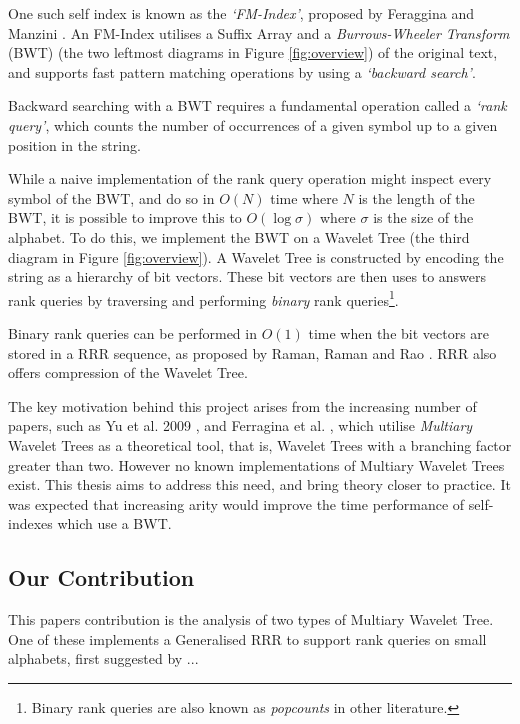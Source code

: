 One such self index is known as the \emph{`FM-Index'}, proposed by
Feraggina and Manzini \cite{fmindex:ferragina2000}. An FM-Index utilises a 
Suffix Array and a \emph{Burrows-Wheeler Transform} (BWT) (the two leftmost 
diagrams in Figure \ref{fig:overview}) of the original text, and supports fast 
pattern matching operations by using a \emph{`backward search'}.

Backward searching with a BWT requires a fundamental operation called a 
\emph{`rank query'}, which counts the number of occurrences of a given symbol up 
to a given position in the string.

While a naive implementation of the rank query operation might inspect every 
symbol of the BWT, and do so in $O(N)$ time where $N$ is the length of the BWT, 
it is possible to improve this to $O(\log \sigma)$ where $\sigma$ is the size of 
the alphabet. To do this, we implement the BWT on a Wavelet Tree (the third 
diagram in Figure 
\ref{fig:overview}). A Wavelet Tree is constructed by encoding the string as a 
hierarchy of bit vectors. These bit vectors are then uses to answers rank 
queries by traversing and performing \emph{binary} rank queries\footnote{ Binary rank queries are also known as \emph{popcounts} in other literature.}.

Binary rank queries can be performed in $O(1)$ time when the bit vectors are stored in
a RRR sequence, as proposed by Raman, Raman and Rao \cite{rrr2007}. RRR also 
offers compression of the Wavelet Tree.

The key motivation behind this project arises from the increasing number of
papers, such as Yu et al. 2009 \cite{yu2009}, and Ferragina et al. 
\cite{ferragina07}, which utilise \emph{Multiary} Wavelet Trees as a theoretical tool, that is, Wavelet Trees with a branching 
factor greater than two. However no known implementations of Multiary Wavelet 
Trees exist. This thesis aims to address this need, and bring theory closer to 
practice. It was expected that increasing arity would improve the time 
performance of self-indexes which use a BWT.


\subsection{Our Contribution}

This papers contribution is the analysis of two types of Multiary Wavelet Tree. 
One of these implements a Generalised RRR to support rank queries on small 
alphabets, first suggested by ...

